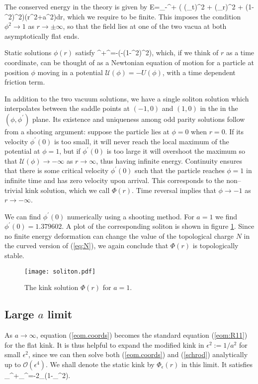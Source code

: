 The conserved energy in the theory is given by
\be
\nonumber
E=\int_{-\infty}^{+\infty} \bigg(  (\phi_t)^2 +  (\phi_r)^2 + (1-\phi^2)^2\bigg)(r^2+a^2)dr,
\ee
which we require to be finite. This imposes the condition $\phi^2\rightarrow 1$ as $r\rightarrow\pm\infty$, so that the field lies at one of the two vacua at both asymptotically flat ends.

Static solutions $\phi(r)$ satisfy
\be
\label{eom.static}
\phi^{\prime\prime}+\phi^{\prime}=-\bigg(-(1-\phi^2)^2\bigg),
\ee
which, if we think of $r$ as a time coordinate, can be thought of as a Newtonian equation of motion for a particle at position $\phi$ moving in a potential $\mathcal{U}(\phi)=-U(\phi)$, with a time dependent friction term.

In addition to the two vacuum solutions, we have a single soliton solution which interpolates between the saddle points at $(-1,0)$ and $(1,0)$ in the in the $(\phi,\phi^\prime)$ plane. Its existence and uniqueness among odd parity solutions follow from a shooting argument: suppose the particle lies at $\phi=0$ when $r=0$. If its velocity $\phi^\prime(0)$ is too small, it will never reach the local maximum of the potential at $\phi=1$, but if $\phi^\prime(0)$ is too large it will overshoot the maximum so that $\mathcal{U}(\phi)\rightarrow -\infty$ as $r\rightarrow\infty$, thus having infinite energy. Continuity ensures that there is some critical velocity $\phi^\prime(0)$ such that the particle reaches $\phi=1$ in infinite time and has zero velocity upon arrival. This corresponds to the non--trivial kink solution, which we call $\Phi(r)$. Time reversal implies that $\phi\rightarrow -1$ as $r\rightarrow -\infty$.

We can find $\phi^\prime(0)$ numerically using a shooting method. For $a=1$ we find $\phi^\prime(0)=1.379602$. A plot of the corresponding soliton is shown in figure \ref{fig:soliton}. Since no finite energy deformation can change the value of the topological charge $N$ in the curved version of (\ref{eq:N}), we again conclude that $\Phi(r)$ is topologically stable.

\begin{figure}
\texttt{[image: soliton.pdf]}
\caption{\label{fig:soliton}The kink solution $\Phi(r)$ for $a=1$.}
\end{figure}
 

\subsection{Large $a$ limit}
As $a\rightarrow\infty$, equation (\ref{eom.coords}) becomes the standard equation (\ref{eom:R11}) for the flat kink. It is thus helpful to expand the modified kink in $\epsilon^2:=1/a^2$ for small $\epsilon^2$, since we can then solve both (\ref{eom.coords}) and (\ref{schrod}) analytically up to $\mathcal{O}(\epsilon^4)$. We shall denote the static kink by $\Phi_\epsilon(r)$ in this limit. It satisfies
\be
\label{eq.large_a}
\Phi_\epsilon^{\prime\prime}+\Phi_\epsilon^{\prime}=-2\Phi_\epsilon(1-\Phi_\epsilon^2).
\ee

